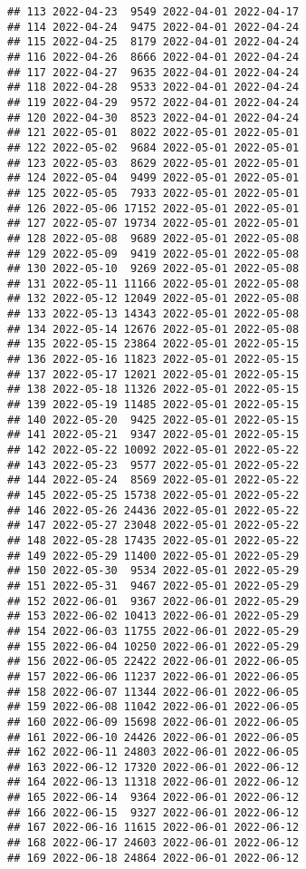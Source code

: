 \documentclass[
]{article}
\begin{document}
\begin{verbatim}
## 113 2022-04-23  9549 2022-04-01 2022-04-17
## 114 2022-04-24  9475 2022-04-01 2022-04-24
## 115 2022-04-25  8179 2022-04-01 2022-04-24
## 116 2022-04-26  8666 2022-04-01 2022-04-24
## 117 2022-04-27  9635 2022-04-01 2022-04-24
## 118 2022-04-28  9533 2022-04-01 2022-04-24
## 119 2022-04-29  9572 2022-04-01 2022-04-24
## 120 2022-04-30  8523 2022-04-01 2022-04-24
## 121 2022-05-01  8022 2022-05-01 2022-05-01
## 122 2022-05-02  9684 2022-05-01 2022-05-01
## 123 2022-05-03  8629 2022-05-01 2022-05-01
## 124 2022-05-04  9499 2022-05-01 2022-05-01
## 125 2022-05-05  7933 2022-05-01 2022-05-01
## 126 2022-05-06 17152 2022-05-01 2022-05-01
## 127 2022-05-07 19734 2022-05-01 2022-05-01
## 128 2022-05-08  9689 2022-05-01 2022-05-08
## 129 2022-05-09  9419 2022-05-01 2022-05-08
## 130 2022-05-10  9269 2022-05-01 2022-05-08
## 131 2022-05-11 11166 2022-05-01 2022-05-08
## 132 2022-05-12 12049 2022-05-01 2022-05-08
## 133 2022-05-13 14343 2022-05-01 2022-05-08
## 134 2022-05-14 12676 2022-05-01 2022-05-08
## 135 2022-05-15 23864 2022-05-01 2022-05-15
## 136 2022-05-16 11823 2022-05-01 2022-05-15
## 137 2022-05-17 12021 2022-05-01 2022-05-15
## 138 2022-05-18 11326 2022-05-01 2022-05-15
## 139 2022-05-19 11485 2022-05-01 2022-05-15
## 140 2022-05-20  9425 2022-05-01 2022-05-15
## 141 2022-05-21  9347 2022-05-01 2022-05-15
## 142 2022-05-22 10092 2022-05-01 2022-05-22
## 143 2022-05-23  9577 2022-05-01 2022-05-22
## 144 2022-05-24  8569 2022-05-01 2022-05-22
## 145 2022-05-25 15738 2022-05-01 2022-05-22
## 146 2022-05-26 24436 2022-05-01 2022-05-22
## 147 2022-05-27 23048 2022-05-01 2022-05-22
## 148 2022-05-28 17435 2022-05-01 2022-05-22
## 149 2022-05-29 11400 2022-05-01 2022-05-29
## 150 2022-05-30  9534 2022-05-01 2022-05-29
## 151 2022-05-31  9467 2022-05-01 2022-05-29
## 152 2022-06-01  9367 2022-06-01 2022-05-29
## 153 2022-06-02 10413 2022-06-01 2022-05-29
## 154 2022-06-03 11755 2022-06-01 2022-05-29
## 155 2022-06-04 10250 2022-06-01 2022-05-29
## 156 2022-06-05 22422 2022-06-01 2022-06-05
## 157 2022-06-06 11237 2022-06-01 2022-06-05
## 158 2022-06-07 11344 2022-06-01 2022-06-05
## 159 2022-06-08 11042 2022-06-01 2022-06-05
## 160 2022-06-09 15698 2022-06-01 2022-06-05
## 161 2022-06-10 24426 2022-06-01 2022-06-05
## 162 2022-06-11 24803 2022-06-01 2022-06-05
## 163 2022-06-12 17320 2022-06-01 2022-06-12
## 164 2022-06-13 11318 2022-06-01 2022-06-12
## 165 2022-06-14  9364 2022-06-01 2022-06-12
## 166 2022-06-15  9327 2022-06-01 2022-06-12
## 167 2022-06-16 11615 2022-06-01 2022-06-12
## 168 2022-06-17 24603 2022-06-01 2022-06-12
## 169 2022-06-18 24864 2022-06-01 2022-06-12

\end{verbatim}
\end{document}
